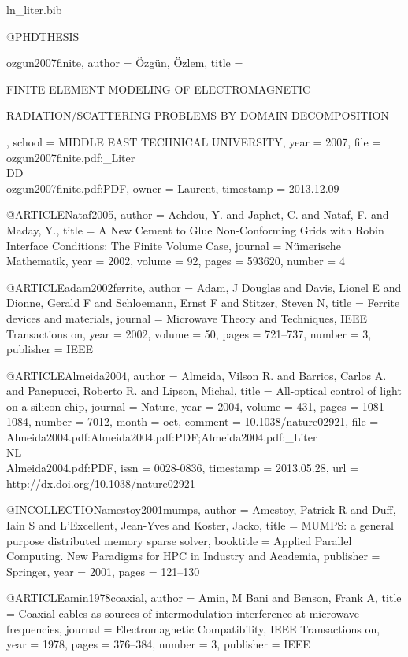 \begin{filecontents*}{ln_liter.bib}

@PHDTHESIS{ozgun2007finite,
  author = {\"Ozg\"un, \"Ozlem},
  title = {FINITE ELEMENT MODELING OF ELECTROMAGNETIC
	
	RADIATION/SCATTERING PROBLEMS BY DOMAIN DECOMPOSITION},
  school = {MIDDLE EAST TECHNICAL UNIVERSITY},
  year = {2007},
  file = {ozgun2007finite.pdf:_Liter\\DD\\ozgun2007finite.pdf:PDF},
  owner = {Laurent},
  timestamp = {2013.12.09}
}

@ARTICLE{Nataf2005,
  author = {Achdou, Y. and Japhet, C. and Nataf, F. and Maday, Y.},
  title = {A New Cement to Glue Non-Conforming Grids with Robin Interface Conditions:
	The Finite Volume Case},
  journal = {N{\"u}merische Mathematik},
  year = {2002},
  volume = {92},
  pages = {593{\textendash}620},
  number = {4}
}

@ARTICLE{adam2002ferrite,
  author = {Adam, J Douglas and Davis, Lionel E and Dionne, Gerald F and Schloemann,
	Ernst F and Stitzer, Steven N},
  title = {Ferrite devices and materials},
  journal = {Microwave Theory and Techniques, IEEE Transactions on},
  year = {2002},
  volume = {50},
  pages = {721--737},
  number = {3},
  publisher = {IEEE}
}

@ARTICLE{Almeida2004,
  author = {Almeida, Vilson R. and Barrios, Carlos A. and Panepucci, Roberto
	R. and Lipson, Michal},
  title = {All-optical control of light on a silicon chip},
  journal = {Nature},
  year = {2004},
  volume = {431},
  pages = {1081--1084},
  number = {7012},
  month = oct,
  comment = {10.1038/nature02921},
  file = {Almeida2004.pdf:Almeida2004.pdf:PDF;Almeida2004.pdf:_Liter\\NL\\Almeida2004.pdf:PDF},
  issn = {0028-0836},
  timestamp = {2013.05.28},
  url = {http://dx.doi.org/10.1038/nature02921}
}

@INCOLLECTION{amestoy2001mumps,
  author = {Amestoy, Patrick R and Duff, Iain S and L'Excellent, Jean-Yves and
	Koster, Jacko},
  title = {{MUMPS}: a general purpose distributed memory sparse solver},
  booktitle = {Applied Parallel Computing. New Paradigms for HPC in Industry and
	Academia},
  publisher = {Springer},
  year = {2001},
  pages = {121--130}
}

@ARTICLE{amin1978coaxial,
  author = {Amin, M Bani and Benson, Frank A},
  title = {Coaxial cables as sources of intermodulation interference at microwave
	frequencies},
  journal = {Electromagnetic Compatibility, IEEE Transactions on},
  year = {1978},
  pages = {376--384},
  number = {3},
  publisher = {IEEE}
}


\end{filecontents*}
